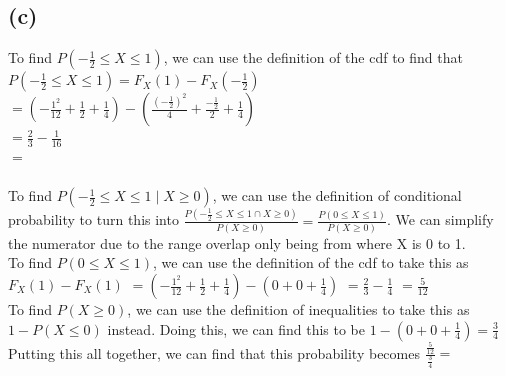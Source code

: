 \documentclass{article}
\begin{document}
{\subsection*{(c)}
To find $P(-\frac{1}{2} \leq X \leq 1)$, we can use the definition of the cdf to find that $P(-\frac{1}{2} \leq X \leq 1) = F_X(1) - F_X(-\frac{1}{2})$ \\ 
$ = (-\frac{1^2}{12} + \frac{1}{2} + \frac{1}{4}) - (\frac{(-\frac{1}{2})^2}{4} + \frac{-\frac{1}{2}}{2} + \frac{1}{4})$ \\ 
$ = \frac{2}{3} - \frac{1}{16}$ \\ 
$ = $  \\ \\ 
To find $P(-\frac{1}{2} \leq X \leq 1 \mid X \geq 0)$, we can use the definition of conditional probability to turn this into $\frac{P(-\frac{1}{2} \leq X \leq 1 \cap X \geq 0)}{P(X \geq 0)} = \frac{P(0 \leq X \leq 1)}{P(X \geq 0)}$. We can simplify the numerator due to the range overlap only being from where X is 0 to 1. \\ 
To find $P(0 \leq X \leq 1)$, we can use the definition of the cdf to take this as $F_X(1) - F_X(1)$
$= (-\frac{1^2}{12} + \frac{1}{2} + \frac{1}{4}) - (0 + 0 + \frac{1}{4})$  
$= \frac{2}{3} - \frac{1}{4}$ 
$ = \frac{5}{12}$ \\
To find $P(X \geq 0)$, we can use the definition of inequalities to take this as $1 - P(X \leq 0)$ instead. Doing this, we can find this to be $1 - (0 + 0 + \frac{1}{4}) = \frac{3}{4}$ \\ 
Putting this all together, we can find that this probability becomes $\frac{\frac{5}{12}}{\frac{3}{4}} = $ 
 
}
\end{document}
